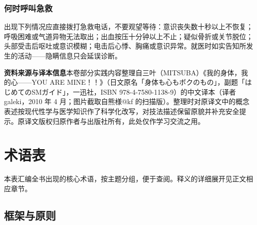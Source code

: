 \documentclass[12pt,UTF8]{ctexbook}
\begin{document}
\subsection{何时呼叫急救}

出现下列情况应直接拨打急救电话，不要观望等待：意识丧失数十秒以上不恢复；呼吸困难或气道异物无法取出；出血按压十分钟以上不止；疑似骨折或关节脱位；头部受击后呕吐或意识模糊；电击后心悸、胸痛或意识异常。就医时如实告知所发生的活动——隐瞒信息只会延误诊断。

\vspace{1em}

\noindent\textbf{资料来源与译本信息}\quad 本卷部分实践内容整理自三叶（MITSUBA）《我的身体，我的心——YOU ARE MINE！！》（日文原名「身体も心もボクのもの」，副题「はじめてのSMガイド」，一迅社，ISBN 978-4-7580-1138-9）的中文译本（译者 galeki，2010 年 4 月；图片截取自熊様@kf 的扫描版）。整理时对原译文中的概念表述按现代性学与医学知识作了科学化改写，对技法描述保留原貌并补充安全提示。原译文版权归原作者与出版社所有，此处仅作学习交流之用。


\appendix

\chapter{术语表}\label{chap:glossary}

本表汇编全书出现的核心术语，按主题分组，便于查阅。释义的详细展开见正文相应章节。

\section{框架与原则}
\end{document}
